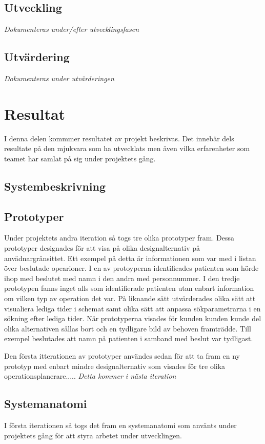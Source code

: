 \documentclass[a4paper,10pt]{article}
\begin{document}
\subsection{Utveckling}
\textit{Dokumenteras under/efter utvecklingsfasen}

\subsection{Utvärdering}
\textit{Dokumenteras under utvärderingen}

\section{Resultat}
I denna delen kommmer resultatet av projekt beskrivas. Det innebär dels
resultate på den mjukvara som ha utvecklats men även vilka erfarenheter som
teamet har samlat på sig under projektets gång.
\subsection{Systembeskrivning}
\subsection{Prototyper}
Under projektets andra iteration så togs tre olika prototyper fram. Dessa
prototyper designades för att visa på olika designalternativ på
anvädnargränsittet. Ett exempel på detta är informationen som var med i listan
över beslutade opearioner. I en av protoyperna identifieades patienten som hörde
ihop med beslutet med namn i den andra med personnummer. I den tredje prototypen
fanns inget alls som identifierade patienten utan enbart information om vilken
typ av operation det var. På liknande sätt utvärderades olika sätt att
visualiera lediga tider i schemat samt olika sätt att anpassa sökparametrarna i
en sökning efter lediga tider. När prototyperna visades för kunden kunden kunde
del olika alternativen sållas bort och en tydligare bild av behoven framträdde.
Till exempel beslutades att namn på patienten i samband med beslut var tydligast.

Den första itterationen av prototyper användes sedan för att ta fram en ny
prototyp med enbart mindre designalternativ som visades för tre olika
operationsplanerare.....
\textit{Detta kommer i nästa iteration}
\subsection{Systemanatomi}
I första iterationen så togs det fram en systemanatomi som använts under
projektets gång för att styra arbetet under utvecklingen.
\end{document}
